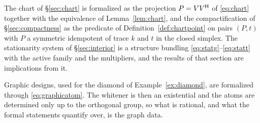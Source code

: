 The chart of \S\ref{sec:chart} is formalized as the projection $P=VV^{\mathsf{H}}$ of
\eqref{eq:chart} together with the equivalence of Lemma~\ref{lem:chart}, and
the compactification of \S\ref{sec:compactness} as the predicate of
Definition~\ref{def:chartpoint} on pairs $(P,t)$ with $P$ a symmetric
idempotent of trace $k$ and $t$ in the closed simplex.  The stationarity
system of \S\ref{sec:interior} is a structure bundling
\eqref{eq:statg}--\eqref{eq:statt} with the active family and the
multipliers, and the results of that section are implications from it.

Graphic designs, used for the diamond of Example~\ref{ex:diamond}, are
formalized through \eqref{eq:graphicatom}.  The whitener is then an
existential and the atoms are determined only up to the orthogonal group,
so what is rational, and what the formal statements quantify over, is the
graph data.

